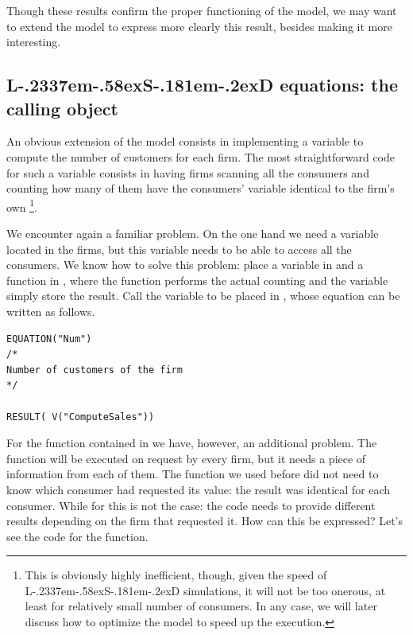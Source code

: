 \documentclass [11pt,a4paper] {book}
\def\LsD{{L\kern-.2337em\lower-.58ex\hbox{S}\kern-.181em\lower-.2ex\hbox{D}}\xspace}
\begin{document}
Though these results confirm the proper functioning of the model, we may want to extend the model to express more clearly this result, besides making it more interesting.

\subsection{\LsD equations: the calling object }
An obvious extension of the model consists in implementing a variable to compute the number of customers for each firm. The most straightforward code for such a variable consists in having firms scanning all the consumers and counting how many of them have the consumers' variable  identical to the firm's own \footnote{This is obviously highly inefficient, though, given the speed of \LsD simulations, it will not be too onerous, at least for relatively small number of consumers. In any case, we will later discuss how to optimize the model to speed up the execution.}.

We encounter again a familiar problem. On the one hand we need a variable located in the firms, but this variable needs to be able to access all the consumers. We know how to solve this problem: place a variable in  and a function in , where the function performs the actual counting and the variable simply store the result. Call  the variable to be placed in , whose equation can be written as follows.

\begin{minipage}[h]{10cm}
\small
\begin{verbatim}
EQUATION("Num")
/*
Number of customers of the firm
*/

RESULT( V("ComputeSales"))

\end{verbatim}
\normalsize
\end{minipage}


For the function  contained in  we have, however, an additional problem. The function will be executed on request by every firm, but it needs a piece of information from each of them. The function   we used before did not need to know which consumer had requested its value: the result was identical for each consumer. While for  this is not the case: the code needs to provide different results depending on the firm that requested it. How can this be expressed? Let's see the code for the function.
\end{document}
